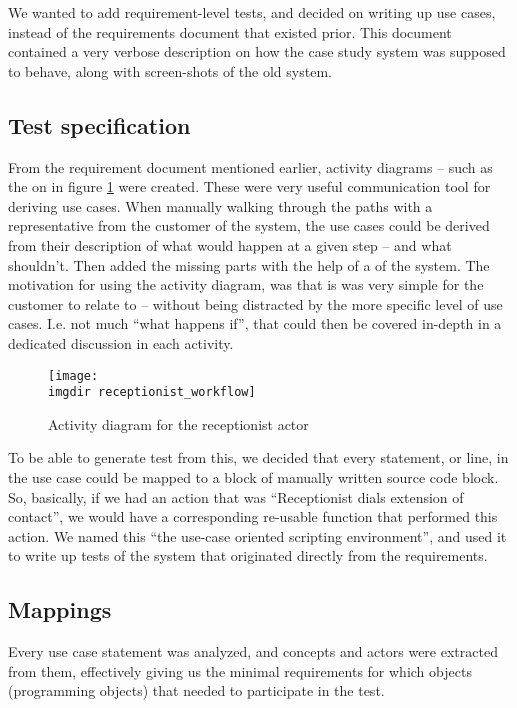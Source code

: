 \noindent We wanted to add requirement-level tests, and decided on writing up use cases, instead of the requirements document that existed prior. This document contained a very verbose description on how the case study system was supposed to behave, along with screen-shots of the old system.

\subsection{Test specification}
\label{sec:1st-iteration-test-specification}
From the requirement document mentioned earlier, activity diagrams -- such as the on in figure \ref{fig:activity_diagram_receptionist} were created. These were very useful communication tool for deriving use cases. When manually walking through the paths with a representative from the customer of the system, the use cases could be derived from their description of what would happen at a given step -- and what shouldn't. Then added the missing parts with the help of a of the system. The motivation for using the activity diagram, was that is was very simple for the customer to relate to -- without being distracted by the more specific level of use cases. I.e. not much ``what happens if'', that could then be covered in-depth in a dedicated discussion in each activity. \medskip

\begin{figure}[h]
\texttt{[image: \\imgdir receptionist\_workflow]}
\centering
\caption{Activity diagram for the receptionist actor}
\label{fig:activity_diagram_receptionist}
\end{figure}

\noindent To be able to generate test from this, we decided that every statement, or line, in the use case could be mapped to a block of manually written source code block. So, basically, if we had an action that was ``Receptionist dials extension of contact'', we would have a corresponding re-usable function that performed this action. We named this ``the use-case oriented scripting environment'', and used it to write up tests of the system that originated directly from the requirements.

\subsection{Mappings}
Every use case statement was analyzed, and concepts and actors were extracted from them, effectively giving us the minimal requirements for which objects (programming objects) that needed to participate in the test.\medskip

